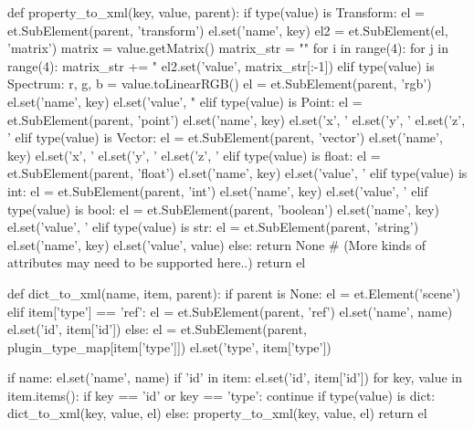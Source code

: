 \begin{python}
    def property_to_xml(key, value, parent):
        if type(value) is Transform:
            el = et.SubElement(parent, 'transform')
            el.set('name', key)
            el2 = et.SubElement(el, 'matrix')
            matrix = value.getMatrix()
            matrix_str = ""
            for i in range(4):
                for j in range(4):
                    matrix_str += "%
            el2.set('value', matrix_str[:-1])
        elif type(value) is Spectrum:
            r, g, b = value.toLinearRGB()
            el = et.SubElement(parent, 'rgb')
            el.set('name', key)
            el.set('value', "%
        elif type(value) is Point:
            el = et.SubElement(parent, 'point')
            el.set('name', key)
            el.set('x', '%
            el.set('y', '%
            el.set('z', '%
        elif type(value) is Vector:
            el = et.SubElement(parent, 'vector')
            el.set('name', key)
            el.set('x', '%
            el.set('y', '%
            el.set('z', '%
        elif type(value) is float:
            el = et.SubElement(parent, 'float')
            el.set('name', key)
            el.set('value', '%
        elif type(value) is int:
            el = et.SubElement(parent, 'int')
            el.set('name', key)
            el.set('value', '%
        elif type(value) is bool:
            el = et.SubElement(parent, 'boolean')
            el.set('name', key)
            el.set('value', '%
        elif type(value) is str:
            el = et.SubElement(parent, 'string')
            el.set('name', key)
            el.set('value', value)
        else:
            return None # (More kinds of attributes may need to be supported here..)
        return el

    def dict_to_xml(name, item, parent):
        if parent is None:
            el = et.Element('scene')
        elif item['type'] == 'ref':
            el = et.SubElement(parent, 'ref')
            el.set('name', name)
            el.set('id', item['id'])
        else:
            el = et.SubElement(parent, plugin_type_map[item['type']])
            el.set('type', item['type'])

        if name:
            el.set('name', name)
        if 'id' in item:
            el.set('id', item['id'])
        for key, value in item.items():
            if key == 'id' or key == 'type':
                continue
            if type(value) is dict:
                dict_to_xml(key, value, el)
            else:
                property_to_xml(key, value, el)
        return el


\end{python}
